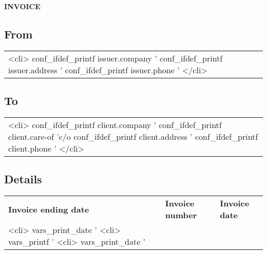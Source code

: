 \documentclass[letterpaper]{article}
\begin{document}
\thispagestyle{empty}

\begin{center}
\huge{\textbf{INVOICE}}
\end{center}

\subsection*{From}
\begin{tabular}{l}
<cli>
    conf_ifdef_printf issuer.company '%
    conf_ifdef_printf issuer.address '%
    conf_ifdef_printf issuer.phone   '%
</cli>
\end{tabular}

\subsection*{To}
\begin{tabular}{l}
<cli>
    conf_ifdef_printf client.company '%
    conf_ifdef_printf client.care-of 'c/o %
    conf_ifdef_printf client.address '%
    conf_ifdef_printf client.phone   '%
</cli>
\end{tabular}

\subsection*{Details}

\begin{center}
\begin{tabular}{l l l}
        \textbf{Invoice ending date} & \textbf{Invoice number} & \textbf{Invoice date} \\
        <cli> vars_print_date '%
        <cli> vars_printf     '%
        <cli> vars_print_date '%
\end{tabular}
\end{center}
\end{document}
